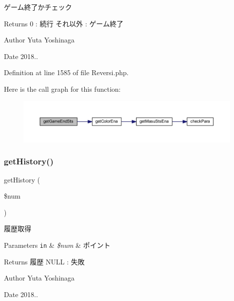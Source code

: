 ゲーム終了かチェック 

\begin{DoxyReturn}{Returns}
0 \+: 続行 それ以外 \+: ゲーム終了 
\end{DoxyReturn}
\begin{DoxyAuthor}{Author}
Yuta Yoshinaga 
\end{DoxyAuthor}
\begin{DoxyDate}{Date}
2018.. 
\end{DoxyDate}


Definition at line 1585 of file Reversi.\+php.

Here is the call graph for this function\+:\nopagebreak
\begin{figure}[H]
\begin{center}
\leavevmode
\includegraphics[width=350pt]{class_reversi_aab9985c789e464de6cf99d7d725cb5a3_cgraph}
\end{center}
\end{figure}
\mbox{\label{class_reversi_a41cae82a798f2b3d0684bda44b837fcf}} 
\subsubsection{\texorpdfstring{get\+History()}{getHistory()}}
{\footnotesize\ttfamily get\+History (\begin{DoxyParamCaption}\item[{}]{\$num }\end{DoxyParamCaption})}



履歴取得 


\begin{DoxyParams}[1]{Parameters}
\mbox{\tt in}  & {\em \$num} & ポイント \\
\hline
\end{DoxyParams}
\begin{DoxyReturn}{Returns}
履歴 N\+U\+LL \+: 失敗 
\end{DoxyReturn}
\begin{DoxyAuthor}{Author}
Yuta Yoshinaga 
\end{DoxyAuthor}
\begin{DoxyDate}{Date}
2018.. 
\end{DoxyDate}



